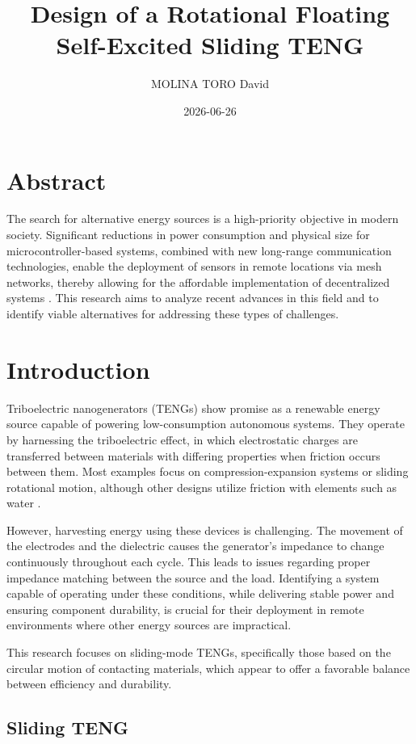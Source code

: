 \documentclass[a4paper,oneside,twocolumn]{article}
\author{MOLINA TORO David}
\date{2026-06-26}
\title{Design of a Rotational Floating Self-Excited Sliding TENG}
\begin{document}
\maketitle

\section{Abstract}

The search for alternative energy sources is a high-priority objective in modern society. Significant reductions in power consumption and physical size for microcontroller-based systems, combined with new long-range communication technologies, enable the deployment of sensors in remote locations via mesh networks, thereby allowing for the affordable implementation of decentralized systems \cite{FISCHER2012}. This research aims to analyze recent advances in this field and to identify viable alternatives for addressing these types of challenges.


\section{Introduction}

Triboelectric nanogenerators (TENGs) show promise as a renewable energy source capable of powering low-consumption autonomous systems. They operate by harnessing the triboelectric effect, in which electrostatic charges are transferred between materials with differing properties when friction occurs between them. Most examples focus on compression-expansion systems or sliding rotational motion, although other designs utilize friction with elements such as water \cite{LIN2013}.

However, harvesting energy using these devices is challenging. The movement of the electrodes and the dielectric causes the generator's impedance to change continuously throughout each cycle. This leads to issues regarding proper impedance matching between the source and the load. Identifying a system capable of operating under these conditions, while delivering stable power and ensuring component durability, is crucial for their deployment in remote environments where other energy sources are impractical.

This research focuses on sliding-mode TENGs, specifically those based on the circular motion of contacting materials, which appear to offer a favorable balance between efficiency and durability.

\subsection{Sliding TENG}
\end{document}
